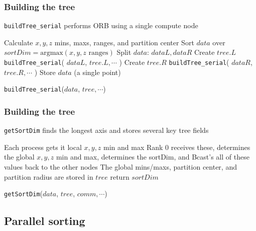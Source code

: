 \documentclass[usernames,dvipsnames]{beamer}
\begin{document}
\begin{frame}
	\frametitle{Building the tree}
	
	\texttt{buildTree\_serial} performs ORB using a single compute node
	
	\vspace{10pt}
	
	\begin{algorithm}[H]
		\footnotesize
		\begin{algorithmic}[1]
				\STATE Calculate $x,y,z$ mins, maxs, ranges, and partition center
				\STATE Sort $data$ over $sortDim = \textrm{argmax}( x,y,z \textrm{ ranges})$
				\STATE Split $data$: $dataL, dataR$
					\STATE Create $tree.L$
					\STATE \texttt{buildTree\_serial}( $dataL$, $tree.L, \cdots$ )
				\ENDIF
					\STATE Create $tree.R$
					\STATE \texttt{buildTree\_serial}( $dataR$, $tree.R, \cdots$ )
				\ENDIF
			\ELSE
				\STATE Store $data$ (a single point)
			\ENDIF
		\end{algorithmic}
	\caption{\texttt{buildTree\_serial}($data$, $tree, \cdots$)}
	\end{algorithm}
		
\end{frame}

\begin{frame}
	\frametitle{Building the tree}
	
	\texttt{getSortDim} finds the longest axis and stores several key tree fields
	
	\vspace{10pt}
	
	\begin{algorithm}[H]
		\begin{algorithmic}[1]
			\STATE Each process gets it local $x,y,z$ min and max
			\STATE Rank 0 receives these, determines the global $x,y,z$ min and max, determines the sortDim, and Bcast's all of these values back to the other nodes
			\STATE The global mins/maxs, partition center, and partition radius are stored in $tree$
			\STATE return $sortDim$
		\end{algorithmic}
		\caption{\texttt{getSortDim}($data$, $tree$, $comm, \cdots$)}
	\end{algorithm}
		
\end{frame}



\subsection{Parallel sorting}
\end{document}
